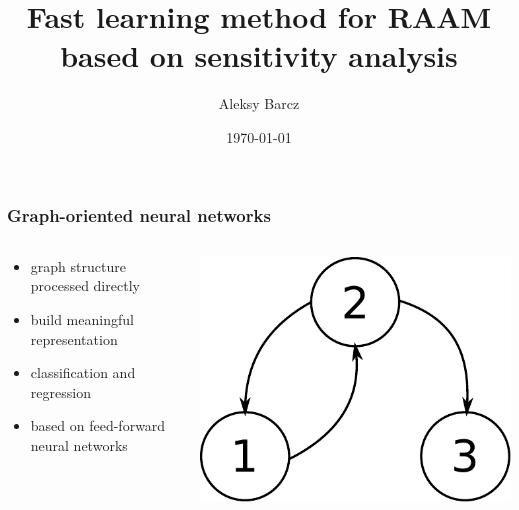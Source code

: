 \documentclass{beamer}
\author{Aleksy Barcz}
\title{Fast learning method for RAAM based on sensitivity analysis}
\date{\today}
\institute{Warsaw University of Technology}
\begin{document}
\frame{\titlepage}

\begin{frame}
\frametitle{Graph-oriented neural networks}
\begin{columns}
	\begin{column}{0.66\textwidth}
		\begin{itemize}
			\item graph structure processed directly
			\item build meaningful representation
			\item classification and regression
			\item based on feed-forward neural networks
		\end{itemize}
	\end{column}
	\begin{column}{0.34\textwidth}
		\includegraphics[scale=0.4]{img/graph}
	\end{column}
\end{columns}
\end{frame}
\end{document}
